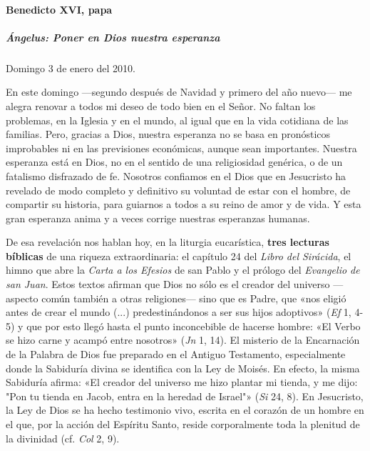 \documentclass[]{article}
\let\oldparagraph\paragraph
\renewcommand{\paragraph}[1]{\oldparagraph{#1}\mbox{}}
\let\oldsubparagraph\subparagraph
\renewcommand{\subparagraph}[1]{\oldsubparagraph{#1}\mbox{}}
\begin{document}
\paragraph{Benedicto XVI, papa}\label{benedicto-xvi-papa-8}

\subparagraph{Ángelus: Poner en Dios nuestra
esperanza}\label{uxe1ngelus-poner-en-dios-nuestra-esperanza}

Domingo 3 de enero del 2010.

En este domingo ---segundo después de Navidad y primero del año nuevo---
me alegra renovar a todos mi deseo de todo bien en el Señor. No faltan
los problemas, en la Iglesia y en el mundo, al igual que en la vida
cotidiana de las familias. Pero, gracias a Dios, nuestra esperanza no se
basa en pronósticos improbables ni en las previsiones económicas, aunque
sean importantes. Nuestra esperanza está en Dios, no en el sentido de
una religiosidad genérica, o de un fatalismo disfrazado de fe. Nosotros
confiamos en el Dios que en Jesucristo ha revelado de modo completo y
definitivo su voluntad de estar con el hombre, de compartir su historia,
para guiarnos a todos a su reino de amor y de vida. Y esta gran
esperanza anima y a veces corrige nuestras esperanzas humanas.

De esa revelación nos hablan hoy, en la liturgia eucarística,
\textbf{tres lecturas bíblicas} de una riqueza extraordinaria: el
capítulo 24 del \emph{Libro del Sirácida}, el himno que abre la
\emph{Carta a los Efesios} de san Pablo y el prólogo del \emph{Evangelio
de san Juan}. Estos textos afirman que Dios no sólo es el creador del
universo ---aspecto común también a otras religiones--- sino que es
Padre, que «nos eligió antes de crear el mundo (...) predestinándonos a
ser sus hijos adoptivos» (\emph{Ef} 1, 4-5) y que por esto llegó hasta
el punto inconcebible de hacerse hombre: «El Verbo se hizo carne y
acampó entre nosotros» (\emph{Jn} 1, 14). El misterio de la Encarnación
de la Palabra de Dios fue preparado en el Antiguo Testamento,
especialmente donde la Sabiduría divina se identifica con la Ley de
Moisés. En efecto, la misma Sabiduría afirma: «El creador del universo
me hizo plantar mi tienda, y me dijo: "Pon tu tienda en Jacob, entra en
la heredad de Israel"» (\emph{Si} 24, 8). En Jesucristo, la Ley de Dios
se ha hecho testimonio vivo, escrita en el corazón de un hombre en el
que, por la acción del Espíritu Santo, reside corporalmente toda la
plenitud de la divinidad (cf. \emph{Col} 2, 9).
\end{document}
